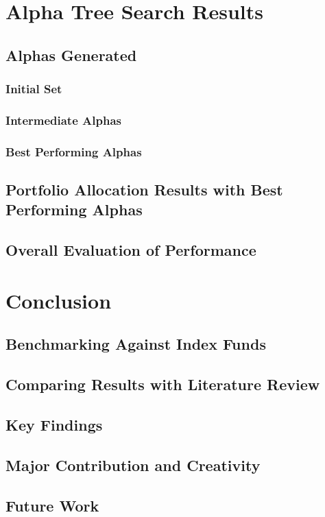 \documentclass[a4paper,12pt]{report}
\numberwithin{equation}{section}
\theoremstyle{definition}
\begin{document}
\chapter{Alpha Tree Search Results}
\section{Alphas Generated}
\subsection{Initial Set}
\subsection{Intermediate Alphas}
\subsection{Best Performing Alphas}
\section{Portfolio Allocation Results with Best Performing Alphas}
\section{Overall Evaluation of Performance}



\chapter{Conclusion}
\section{Benchmarking Against Index Funds}
\section{Comparing Results with Literature Review}
\section{Key Findings}
\section{Major Contribution and Creativity}
\section{Future Work}
\end{document}

